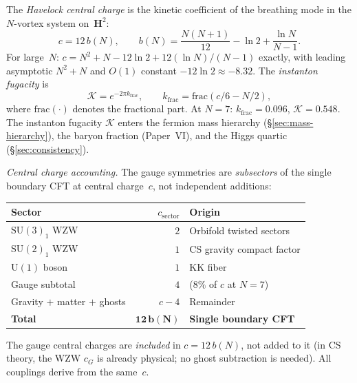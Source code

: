 \begin{definition}
\label{def:central-charge}
The \emph{Havelock central charge} is the kinetic coefficient of
the breathing mode in the $N$-vortex system on~$\mathbf{H}^2$:
\begin{equation}\label{eq:central-charge}
  c = 12\,b(N), \qquad
  b(N) = \frac{N(N{+}1)}{12} - \ln 2 + \frac{\ln N}{N{-}1}.
\end{equation}
For large~$N$:
$c = N^2 + N - 12\ln 2 + 12(\ln N)/(N{-}1)$ exactly,
with leading asymptotic $N^2 + N$ and $O(1)$ constant $-12\ln 2 \approx -8.32$.
The \emph{instanton fugacity} is
\begin{equation}\label{eq:instanton-K}
  \mathcal{K} = e^{-2\pi k_{\mathrm{frac}}}, \qquad
  k_{\mathrm{frac}} = \mathrm{frac}(c/6 - N/2),
\end{equation}
where $\mathrm{frac}(\cdot)$ denotes the fractional part.
At $N = 7$: $k_{\mathrm{frac}} = 0.096$, $\mathcal{K} = 0.548$.
The instanton fugacity $\mathcal{K}$ enters the fermion mass hierarchy
(\S\ref{sec:mass-hierarchy}), the baryon fraction
(Paper~VI), and the Higgs quartic
(\S\ref{sec:consistency}).

\emph{Central charge accounting.}
The gauge symmetries are \emph{subsectors} of the single boundary
CFT at central charge~$c$, not independent additions:
\begin{center}
\small
\begin{tabular}{lrl}
\toprule
Sector & $c_{\mathrm{sector}}$ & Origin \\
\midrule
$\mathrm{SU}(3)_1$ WZW & $2$ & Orbifold twisted sectors \\
$\mathrm{SU}(2)_1$ WZW & $1$ & CS gravity compact factor \\
$\mathrm{U}(1)$ boson & $1$ & KK fiber \\
\midrule
Gauge subtotal & $4$ & ($8\%$ of $c$ at $N = 7$) \\
Gravity $+$ matter $+$ ghosts & $c - 4$ & Remainder \\
\midrule
\textbf{Total} & $\mathbf{12\,b(N)}$ & \textbf{Single boundary CFT} \\
\bottomrule
\end{tabular}
\end{center}
\noindent
The gauge central charges are \emph{included} in $c = 12\,b(N)$,
not added to it (in CS theory, the WZW $c_G$ is already physical;
no ghost subtraction is needed).
All couplings derive from the same~$c$.
\end{definition}

